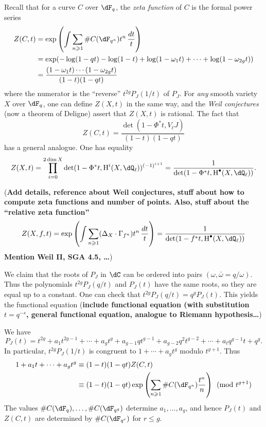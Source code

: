 \documentclass{article}
\begin{document}
Recall that for a curve $C$ over $\dF_q$, the \emph{zeta function} of $C$ is 
the formal power series 
\begin{align*}
  Z(C,t) &= \exp\left(\int \sum_{n\geqslant 1} \# C(\dF_{q^n}) t^n\, \frac{dt}{t}\right) \\
    &= \exp(-\log(1-q t) - \log(1-t) + \log(1-\omega_1 t) + \cdots + \log(1-\omega_{2 g} t)) \\
    &= \frac{(1-\omega_1 t)\cdots (1-\omega_{2g} t)}{(1-t)(1-q t)} 
\end{align*}
where the numerator is the ``reverse'' $t^{2g} P_J(1/t)$ of $P_J$. For 
\emph{any} smooth variety $X$ over $\dF_q$, one can define $Z(X,t)$ in the same 
way, and the \emph{Weil conjectures} (now a theorem of Deligne) assert that 
$Z(X,t)$ is rational. The fact that 
\[
  Z(C,t) = \frac{\det(1-\Phi^\ast t,V_\ell J)}{(1-t)(1-q t)}
\]
has a general analogue. One has equality 
\[
  Z(X,t) = \prod_{i=0}^{2\dim X} \det(1-\Phi^\ast t,\h^i(X,\dQ_\ell))^{(-1)^{i+1}} = \frac{1}{\det(1-\Phi^\ast t,\h^\bullet(X,\dQ_\ell))} \text{.}
\]

(\textbf{Add details, reference about Weil conjectures, stuff about how to 
compute zeta functions and number of points. Also, stuff about the 
``relative zeta function'' 
\[
  Z(X,f,t) = \exp\left(\int \sum_{n\geqslant 1} (\Delta_X\cdot \Gamma_{f^n}) t^n\, \frac{dt}{t}\right) = \frac{1}{\det(1-f^\ast t,\h^\bullet(X,\dQ_\ell))} 
\]
Mention Weil II, SGA 4.5, \ldots})

We claim that the roots of $P_J$ in $\dC$ can be ordered into pairs 
$(\omega,\bar\omega=q/\omega)$. Thus the polynomials $t^{2 g} P_J(q/t)$ and 
$P_J(t)$ have the same roots, so they are equal up to a constant. One can 
check that $t^{2 g} P_J(q/t) = q^g P_J(t)$. This yields the functional equation 
(\textbf{include functional equation (with substitution 
$t=q^{-s}$, general functional equation, analogue to Riemann hypothesis\ldots})

We have 
\[
  P_J(t) = t^{2g} + a_1 t^{2g-1} + \cdots + a_g t^g + a_{g-1} q t^{g-1} + a_{g-2} q^2 t^{g-2} + \cdots + a_t q^{g-1} t + q^g \text{.}
\]
In particular, $t^{2g} P_J(1/t)$ is congruent to 
$1+\cdots + a_g t^g$ modulo $t^{g+1}$. Thus 
\begin{align*}
  1+ a_1 t + \cdots + a_g t^g &\equiv (1-t)(1-q t)Z(C,t) \\
    &\equiv (1-t)(1-q t)\exp\left(\sum_{n\geqslant 1} \# C(\dF_{q^n}) \frac{t^n}{n}\right) \pmod{t^{g+1}}
\end{align*}
The values $\# C(\dF_q),\dots,\# C(\dF_{q^g})$ determine $a_1,\dots,a_g$, and 
hence $P_J(t)$ and $Z(C,t)$ are determined by 
$\# C(\dF_{q^r})$ for $r\leqslant g$. 
\end{document}
